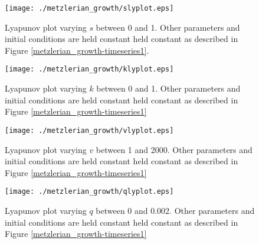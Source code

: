 \begin{figure}
    \centering
    \texttt{[image: ./metzlerian\_growth/slyplot.eps]}
    \caption{Lyapunov plot varying $s$ between 0 and 1. Other parameters and initial conditions are held constant held constant as described in Figure \ref{metzlerian_growth-timeseries1}.}
    \label{metzlerian_growth-slyapunov}
\end{figure}
\begin{figure}
    \centering
    \texttt{[image: ./metzlerian\_growth/klyplot.eps]}
    \caption{Lyapunov plot varying $k$ between 0 and 1. Other parameters and initial conditions are held constant held constant as described in Figure \ref{metzlerian_growth-timeseries1}}
    \label{metzlerian_growth-klyapunov}
\end{figure}
\begin{figure}
    \centering
    \texttt{[image: ./metzlerian\_growth/vlyplot.eps]}
    \caption{Lyapunov plot varying $v$ between 1 and 2000. Other parameters and initial conditions are held constant held constant as described in Figure \ref{metzlerian_growth-timeseries1}}
    \label{metzlerian_growth-lyapunov}
\end{figure}
\begin{figure}
    \centering
    \texttt{[image: ./metzlerian\_growth/qlyplot.eps]}
    \caption{Lyapunov plot varying $q$ between 0 and 0.002. Other parameters and initial conditions are held constant held constant as described in Figure \ref{metzlerian_growth-timeseries1}}
    \label{metzlerian_growth-qlyapunov}
\end{figure}

